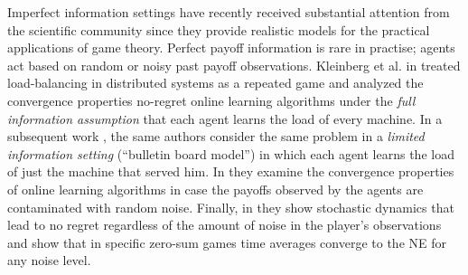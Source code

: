 Imperfect information settings have recently received substantial attention
from the scientific community since they provide realistic models for the
practical applications of game theory.  Perfect payoff information is rare in
practise; agents act based on random or noisy past payoff observations.
Kleinberg et al. in \cite{KPT09} treated load-balancing in distributed systems
as a repeated game and analyzed the convergence properties no-regret online
learning algorithms under the \emph{full information assumption} that each
agent learns the load of every machine.  In a subsequent work \cite{KPT11}, the
same authors consider the same problem in a \emph{limited information setting}
(\enquote{bulletin board model}) in which each agent learns the load of just
the machine that served him. In \cite{HCM17,MS17} they examine the convergence
properties of online learning algorithms in case the payoffs observed by the
agents are contaminated with random noise.  Finally, in \cite{BM17} they show
stochastic dynamics that lead to no regret regardless of the amount of noise in
the player's observations and show that in specific zero-sum games time
averages converge to the NE for any noise level.
